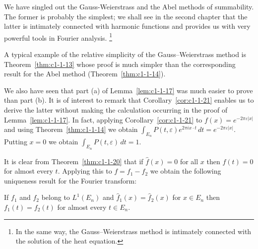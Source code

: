We have singled out the Gauss-Weierstrass and the Abel methods of summability.
The former is probably the simplest; we shall see in the second chapter that the
latter is intimately connected with harmonic functions and provides us with very
powerful tools in Fourier analysis.%
\footnote{In the same way, the Gauss--Weierstrass method is intimately connected
with the solution of the heat equation.}

A typical example of the relative simplicity of the Gauss--Weierstrass method is
Theorem~\ref{thm:c1-1-13} whose proof is much simpler than the corresponding
result for the Abel method (Theorem~\ref{thm:c1-1-14}).

We also have seen that part (a) of Lemma~\ref{lem:c1-1-17} was much easier to
prove than part (b). It is of interest to remark that
Corollary~\ref{cor:c1-1-21} enables us to derive the latter without making the
calculation occurring in the proof of Lemma~\ref{lem:c1-1-17}. In fact, applying
Corollary~\ref{cor:c1-1-21} to $f(x) = e^{-2\pi\varepsilon|x|}$ and using
Theorem~\ref{thm:c1-1-14} we obtain
$\int_{E_{n}} P(t, \varepsilon)e^{2\pi i x \cdot t} \, dt = e^{-2\pi\varepsilon|x|}$.
Putting $x = 0$ we obtain $\int_{E_{n}} P(t, \varepsilon) \, dt = 1$.

It is clear from Theorem~\ref{thm:c1-1-20} that if $\hat{f}(x) = 0$ for all $x$
then $f(t) = 0$ for almost every $t$. Applying this to $f = f_{1} - f_{2}$ we
obtain the following uniqueness result for the Fourier transform:

\begin{corollary}\label{cor:c1-1-22}
If $f_{1}$ and $f_{2}$ belong to $L^{1}(E_{n})$ and
$\hat{f}_{1}(x) = \hat{f}_{2}(x)$ for $x \in E_{n}$ then $f_{1}(t) = f_{2}(t)$
for almost every $t \in E_{n}$.
\end{corollary}

